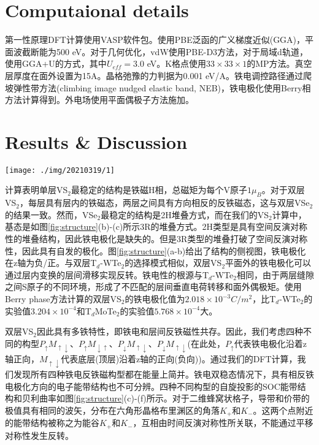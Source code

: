 \documentclass[reprint, aps, prb, showkeys]{revtex4-2}
\begin{document}
\section{Computaional details}
第一性原理DFT计算使用VASP软件包。使用PBE泛函的广义梯度近似(GGA)，平面波截断能为500 eV。对于几何优化，vdW使用PBE-D3方法，对于局域d轨道，使用GGA+U的方式，其中$U_{eff} = 3.0$ eV。K格点使用$33 \times 33 \times 1$的MP方法。真空层厚度在面外设置为15A。晶格弛豫的力判据为0.001 eV/A。铁电调控路径通过爬坡弹性带方法(climbing image nudged elastic band, NEB)，铁电极化使用Berry相方法计算得到。外电场使用平面偶极子方法施加。

\section{Results \& Discussion}
\begin{figure*}[t]
    \texttt{[image: ./img/20210319/1]}
    \caption{\label{fig:structure} 
    (a)-(b)双层VS$_2$晶体的侧视图，铁电极化分别与z轴正向反平行和平行。SOC铁电反铁磁构型$P_{\downarrow}M_{\uparrow\downarrow}$和$P_{\uparrow}M_{\downarrow\uparrow}$如图(c)所示。第一布里渊区的Berry曲率分布如图(d)所示。考虑SOC构型的$P_{\downarrow}M_{\downarrow\uparrow}$和$P_{\uparrow}M_{\uparrow\downarrow}$如图(e)所示，Berry曲率如图(f)所示。
    }
\end{figure*}

计算表明单层VS$_2$最稳定的结构是铁磁H相，总磁矩为每个V原子$1 \mu_B$。对于双层VS$_2$，每层具有层内的铁磁态，两层之间具有方向相反的反铁磁态，这与双层VSe$_2$的结果一致。然而，VSe$_2$最稳定的结构是2H堆叠方式，而在我们的VS$_2$计算中，基态是如图\ref{fig:structure}(b)-(c)所示3R的堆叠方式。2H类型是具有空间反演对称性的堆叠结构，因此铁电极化是缺失的。但是3R类型的堆叠打破了空间反演对称性，因此具有自发的极化。图\ref{fig:structure}(a-b)给出了结构的侧视图，铁电极化在z轴为负/正。与双层T$_d$-WTe$_2$的选择模式相似，双层VS$_2$平面外的铁电极化可以通过层内变换的层间滑移实现反转。铁电性的根源与T$_d$-WTe$_2$相同，由于两层缝隙之间S原子的不同环境，形成了不匹配的层间垂直电荷转移和面外偶极矩。使用Berry phase方法计算的双层VS$_2$的铁电极化值为$2.018 \times 10^{-3} C/m^2$，比T$_d$-WTe$_2$的实验值$3.204 \times 10^{-4}$和T$_d$MoTe$_2$的实验值$5.768 \times 10 ^{-4}$大。

双层VS$_2$因此具有多铁特性，即铁电和层间反铁磁性共存。因此，我们考虑四种不同的构型$P_{\uparrow}M_{\uparrow\downarrow}$、$P_{\uparrow}M_{\downarrow\uparrow}$、$P_{\downarrow}M_{\uparrow\downarrow}$、$P_{\downarrow}M_{\uparrow\downarrow}$(在此处，$P_{\uparrow}$代表铁电极化沿着z轴正向，$M_{\uparrow\downarrow}$代表底层(顶层)沿着z轴的正向(负向))。通过我们的DFT计算，我们发现所有四种铁电反铁磁构型都在能量上简并。铁电双稳态情况下，具有相反铁电极化方向的电子能带结构也不可分辨。四种不同构型的自旋投影的SOC能带结构和贝利曲率如图\ref{fig:structure}(c)-(f)所示。对于二维蜂窝状格子，导带和价带的极值具有相同的波矢，分布在六角形晶格布里渊区的角落$K_{+}$和$K_{-}$。这两个点附近的能带结构被称之为能谷$K_{+}$和$K_{-}$，互相由时间反演对称性所关联，不能通过平移对称性发生反转。
\end{document}

